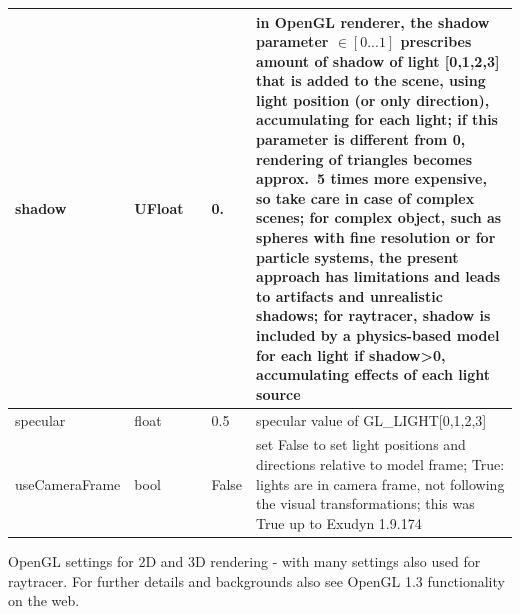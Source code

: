 \begin{center}
\begin{longtable}{| p{4.2cm} | p{2.5cm} | p{0.3cm} | p{3.0cm} | p{6cm} |}
    shadow &     UFloat &      &     0. &     in OpenGL renderer, the shadow parameter $\in [0 ... 1]$ prescribes amount of shadow of light [0,1,2,3] that is added to the scene, using light position (or only direction), accumulating for each light; if this parameter is different from 0, rendering of triangles becomes approx.\ 5 times more expensive, so take care in case of complex scenes; for complex object, such as spheres with fine resolution or for particle systems, the present approach has limitations and leads to artifacts and unrealistic shadows; for raytracer, shadow is included by a physics-based model for each light if shadow>0, accumulating effects of each light source\\ \hline
    specular &     float &      &     0.5 &     specular value of GL\_LIGHT[0,1,2,3]\\ \hline
    useCameraFrame &     bool &      &     False &     set False to set light positions and directions relative to model frame; True: lights are in camera frame, not following the visual transformations; this was True up to Exudyn 1.9.174\\ \hline
	  \end{longtable}
	\end{center}



\label{sec:VSettingsOpenGL}
OpenGL settings for 2D and 3D rendering - with many settings also used for raytracer. For further details and backgrounds also see OpenGL 1.3 functionality on the web.

